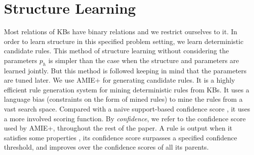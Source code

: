 \documentclass[akbc,twoside,11pt]{article}
\newcommand{\ondrej}[1]{\textcolor{red}{O: {#1}}}
\newcommand{\arcchit}[1]{\textcolor{red}{A: {#1}}}
\newcommand{\algorithmname}{SafeLearner\xspace}
\begin{document}
\section{Structure Learning}
\label{sec:structure_learning}
Most relations of KBs have binary relations and we restrict ourselves to it. In order to learn structure in this specified problem setting, we learn deterministic candidate rules. %
This method of structure learning without considering the parameters $p_h$ is simpler than the case when the structure and parameters are learned jointly. But this method is followed keeping in mind that the parameters are tuned later. 
We use AMIE+ for generating candidate rules. It is a highly efficient rule generation system for mining deterministic rules from KBs. It uses a language bias (constraints on the form of mined rules) to mine the rules from a vast search space. Compared with a naive support-based confidence score \cite{DBLP:conf/sigmod/AgrawalIS93}, it uses a more involved scoring function. %
By \textit{confidence}, we refer to the confidence score used by AMIE+, throughout the rest of the paper. A rule is output when it satisfies some properties \citep{DBLP:journals/vldb/GalarragaTHS15}, its confidence score surpasses a specified confidence threshold, and improves over the confidence scores of all its parents.

\end{document}
